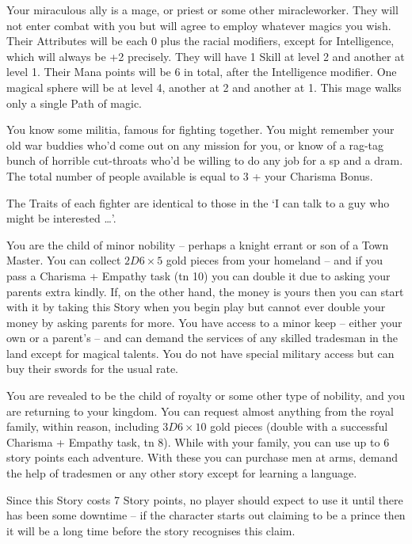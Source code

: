 \begin{multicols}{2}
Your miraculous ally is a mage, or priest or some other \gls{miracleworker}. They will not enter combat with you but will agree to employ whatever magics you wish. Their Attributes will be each 0 plus the racial modifiers, except for Intelligence, which will always be +2 precisely. They will have 1 Skill at level 2 and another at level 1. Their Mana points will be 6 in total, after the Intelligence modifier. One magical sphere will be at level 4, another at 2 and another at 1. This mage walks only a single Path of magic.

You know some militia, famous for fighting together. You might remember your old war buddies who'd come out on any mission for you, or know of a rag-tag bunch of horrible cut-throats who'd be willing to do any job for a \gls{sp} and a dram. The total number of people available is equal to 3 + your Charisma Bonus.

The Traits of each fighter are identical to those in the `I can talk to a guy who might be interested {\dots}'.

You are the child of minor nobility -- perhaps a knight errant or son of a Town Master. You can collect $2D6 \times 5$ gold pieces from your homeland -- and if you pass a Charisma + Empathy task (\gls{tn} 10) you can double it due to asking your parents extra kindly. If, on the other hand, the money is yours then you can start with it by taking this Story when you begin play but cannot ever double your money by asking parents for more. You have access to a minor keep -- either your own or a parent's -- and can demand the services of any skilled tradesman in the land except for magical talents. You do not have special military access but can buy their swords for the usual rate.

You are revealed to be the child of royalty or some other type of nobility, and you are returning to your kingdom. You can request almost anything from the royal family, within reason, including $3D6 \times 10$ gold pieces (double with a successful Charisma + Empathy task, \gls{tn} 8). While with your family, you can use up to 6 story points each adventure. With these you can purchase men at arms, demand the help of tradesmen or any other story except for learning a language.

Since this Story costs 7 Story points, no player should expect to use it until there has been some downtime -- if the character starts out claiming to be a prince then it will be a long time before the story recognises this claim.

\end{multicols}


